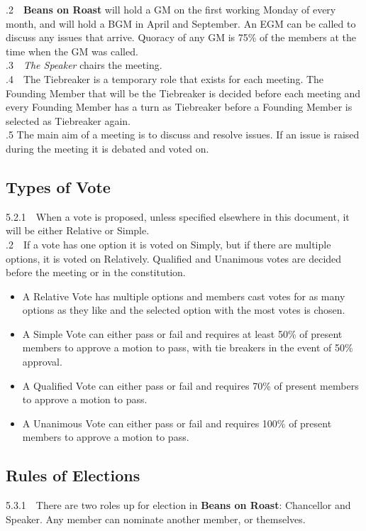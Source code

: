 \documentclass[a4paper,11pt]{article}
\begin{document}
.2$\quad$\textbf{Beans on Roast} will hold a GM on the first working Monday of every month, and will hold a BGM in April and September. An EGM can be called to discuss any issues that arrive. Quoracy of any GM is 75\% of the members at the time when the GM was called.\\ 

.3$\quad$\textit{The Speaker} chairs the meeting. \\

.4$\quad$The Tiebreaker is a temporary role that exists for each meeting. The Founding Member that will be the Tiebreaker is decided before each meeting and every Founding Member has a turn as Tiebreaker before a Founding Member is selected as Tiebreaker again. \\

.5 The main aim of a meeting is to discuss and resolve issues. If an issue is raised during the meeting it is debated and voted on. 
\subsection{Types of Vote}
\label{Types of Vote}
5.2.1$\quad$When a vote is proposed, unless specified elsewhere in this document, it will be either Relative or Simple.\\

.2$\quad$If a vote has one option it is voted on Simply, but if there are multiple options, it is voted on Relatively. Qualified and Unanimous votes are decided before the meeting or in the constitution. 
\begin{itemize}
\item A Relative Vote has multiple options and members cast votes for as many options as they like and the selected option with the most votes is chosen. 
\item A Simple Vote can either pass or fail and requires at least 50\% of present members to approve a motion to pass, with tie breakers in the event of 50\% approval. 
\item A Qualified Vote can either pass or fail and requires 70\% of present members to approve a motion to pass. 
\item A Unanimous Vote can either pass or fail and requires 100\% of present members to approve a motion to pass. 
\end{itemize}

\subsection{Rules of Elections}
\label{Rules of Elections}
5.3.1$\quad$There are two roles up for election in \textbf{Beans on Roast}: Chancellor and Speaker. Any member can nominate another member, or themselves.\\ 
\end{document}

